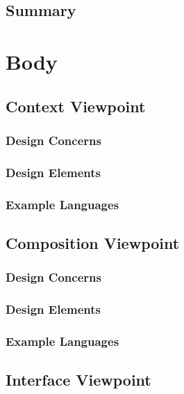 \documentclass[onecolumn, draftclsnofoot,10pt, compsoc]{IEEEtran}
\begin{document}
\subsection{Summary}

\section{Body}

\subsection{Context Viewpoint}
\subsubsection{Design Concerns}

\subsubsection{Design Elements}

\subsubsection{Example Languages}

\subsection{Composition Viewpoint}
\subsubsection{Design Concerns}

\subsubsection{Design Elements}

\subsubsection{Example Languages}

\subsection{Interface Viewpoint}
\end{document}
